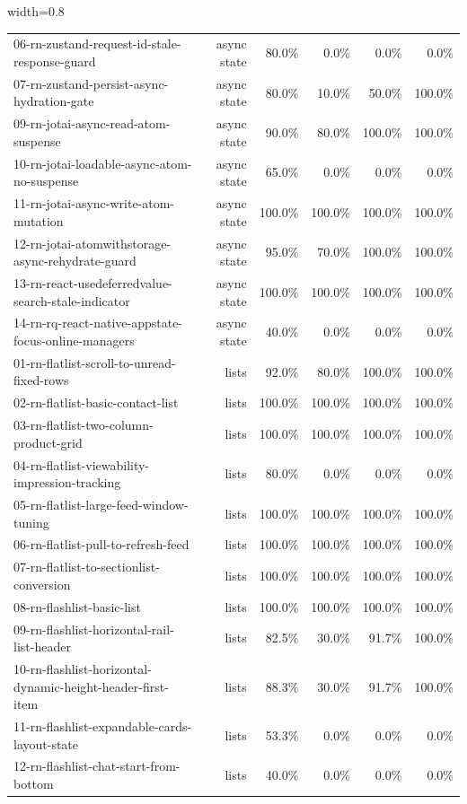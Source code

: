 \begin{table}[htbp]
\begin{adjustbox}{width=0.8\textwidth}
\begin{tabular}{lrrrrr}
06-rn-zustand-request-id-stale-response-guard & async state & 80.0\% & 0.0\% & 0.0\% & 0.0\% \\
07-rn-zustand-persist-async-hydration-gate & async state & 80.0\% & 10.0\% & 50.0\% & 100.0\% \\
09-rn-jotai-async-read-atom-suspense & async state & 90.0\% & 80.0\% & 100.0\% & 100.0\% \\
10-rn-jotai-loadable-async-atom-no-suspense & async state & 65.0\% & 0.0\% & 0.0\% & 0.0\% \\
11-rn-jotai-async-write-atom-mutation & async state & 100.0\% & 100.0\% & 100.0\% & 100.0\% \\
12-rn-jotai-atomwithstorage-async-rehydrate-guard & async state & 95.0\% & 70.0\% & 100.0\% & 100.0\% \\
13-rn-react-usedeferredvalue-search-stale-indicator & async state & 100.0\% & 100.0\% & 100.0\% & 100.0\% \\
14-rn-rq-react-native-appstate-focus-online-managers & async state & 40.0\% & 0.0\% & 0.0\% & 0.0\% \\
01-rn-flatlist-scroll-to-unread-fixed-rows & lists & 92.0\% & 80.0\% & 100.0\% & 100.0\% \\
02-rn-flatlist-basic-contact-list & lists & 100.0\% & 100.0\% & 100.0\% & 100.0\% \\
03-rn-flatlist-two-column-product-grid & lists & 100.0\% & 100.0\% & 100.0\% & 100.0\% \\
04-rn-flatlist-viewability-impression-tracking & lists & 80.0\% & 0.0\% & 0.0\% & 0.0\% \\
05-rn-flatlist-large-feed-window-tuning & lists & 100.0\% & 100.0\% & 100.0\% & 100.0\% \\
06-rn-flatlist-pull-to-refresh-feed & lists & 100.0\% & 100.0\% & 100.0\% & 100.0\% \\
07-rn-flatlist-to-sectionlist-conversion & lists & 100.0\% & 100.0\% & 100.0\% & 100.0\% \\
08-rn-flashlist-basic-list & lists & 100.0\% & 100.0\% & 100.0\% & 100.0\% \\
09-rn-flashlist-horizontal-rail-list-header & lists & 82.5\% & 30.0\% & 91.7\% & 100.0\% \\
10-rn-flashlist-horizontal-dynamic-height-header-first-item & lists & 88.3\% & 30.0\% & 91.7\% & 100.0\% \\
11-rn-flashlist-expandable-cards-layout-state & lists & 53.3\% & 0.0\% & 0.0\% & 0.0\% \\
12-rn-flashlist-chat-start-from-bottom & lists & 40.0\% & 0.0\% & 0.0\% & 0.0\% \\

\end{tabular}
\end{adjustbox}
\end{table}
